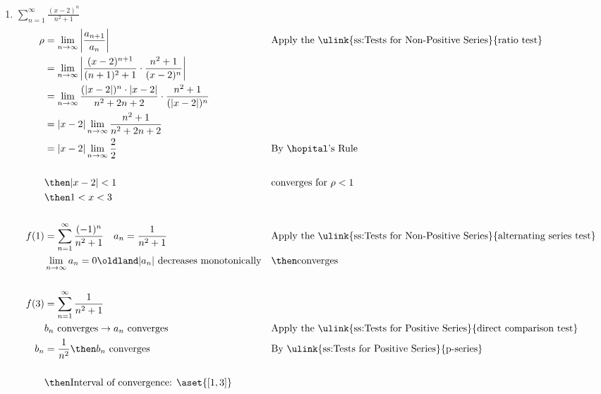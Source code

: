 \begin{enumerate}
\begin{enumerate}[itemsep=24em]
    \item \(\displaystyle \sum_{n=1}^{\infty} \frac{(x-2)^n}{n^2+1} \)
      \begin{align*}
      \rho &= \lim_{n \to \infty} \left| \frac{a_{n+1}}{a_n}  \right|
           && \text{Apply the \ulink{ss:Tests for Non-Positive Series}{ratio test}} \\
           &= \lim_{n \to \infty} \left|
           \frac{(x-2)^{n+1}}{(n+1)^2 + 1} \cdot
           \frac{n^2+1}{(x-2)^n}
           \right| \\
           &= \lim_{n \to \infty}
           \frac{(|x-2|)^n \cdot |x-2|}{n^2 + 2n + 2} \cdot
           \frac{n^2+1}{(|x-2|)^n} \\
           &= |x-2| \lim_{n \to \infty}
           \frac{n^2 + 1}{n^2+2n+2} \\
           &= |x-2| \lim_{n \to \infty}
           \frac{2}{2}
           && \text{By \hopital's Rule} \\
           \\
           &\then |x-2| < 1
           && \text{converges for } \rho <1 \\
           &\then 1 < x < 3 \\
           \\
           f(1) &= \sum_{n=1}^{\infty} \frac{(-1)^n}{n^2 + 1}
           \quad a_n = \frac{1}{n^2 + 1}
           && \text{Apply the \ulink{ss:Tests for Non-Positive Series}{alternating series test}} \\
           &\lim_{n \to \infty} a_n = 0 \oldland
           |a_n|~\text{decreases monotonically}
           &&\then \text{converges} \\
           \\
           f(3) &= \sum_{n=1}^{\infty} \frac{1}{n^2 + 1}\\
                & b_n ~\text{converges} \to a_n~\text{converges}~
                && \text{Apply the \ulink{ss:Tests for Positive Series}{direct comparison test}} \\
           b_n &= \frac{1}{n^2} \then b_n ~\text{converges}
                && \text{By \ulink{ss:Tests for Positive Series}{p-series}} \\
                \\
                &\then \text{Interval of convergence: }
                \aset{\left[ 1, 3 \right] }
      \end{align*}
  \end{enumerate}

\newpage %


\end{enumerate}
